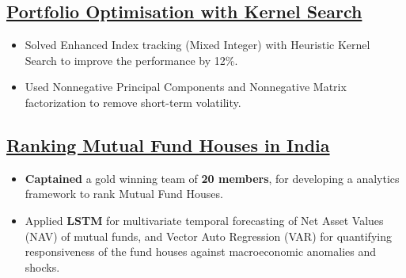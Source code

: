 \documentclass[a4,10pt]{article}
\newenvironment{zitemize}{
\begin{itemize}\itemsep0pt \parskip0pt \parsep1pt}
{\end{itemize}\vspace{-0.4cm}}
\begin{document}

\subsection*{\href{https://github.com/ashish1610dhiman/enhanced_index_tracking}{Portfolio Optimisation with Kernel Search} \hfill {\normalsize{}}} 
\vspace{0.043cm}
    \begin{zitemize}
        \item Solved Enhanced Index tracking (Mixed Integer) with Heuristic Kernel Search to improve the performance by 12\%.
        \item Used Nonnegative Principal Components and Nonnegative Matrix factorization to remove short-term volatility.
    \end{zitemize}
    
\subsection*{\href{https://drive.google.com/file/d/1tAvEzsKtTg2SOw8D77WdrFSnbWRt9m48/view?usp=sharing}{Ranking Mutual Fund Houses in India} \hfill {\normalsize{}}} 
\vspace{0.043cm}
    \begin{zitemize}
        \item \textbf{Captained} a gold winning team of \textbf{20 members}, for developing a analytics framework to rank Mutual Fund Houses.
        \item Applied \textbf{LSTM} for multivariate temporal forecasting of Net Asset Values (NAV) of mutual funds, and Vector Auto Regression (VAR) for quantifying responsiveness of the fund houses against macroeconomic anomalies and shocks.
    \end{zitemize}    
\end{document}
